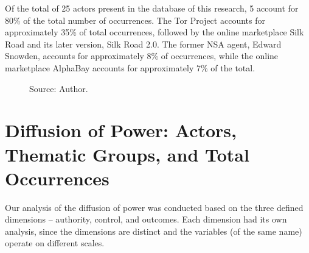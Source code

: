 Of the total of 25 actors present in the database of this research, 5 account for 80\% of the total number of occurrences. The Tor Project accounts for approximately 35\% of total occurrences, followed by the online marketplace Silk Road and its later version, Silk Road 2.0. The former NSA agent, Edward Snowden, accounts for approximately 8\% of occurrences, while the online marketplace AlphaBay accounts for approximately 7\% of the total.

\begin{figure}[H]
\centering
{}
\caption*{Source: Author.}
\end{figure}

\section{Diffusion of Power: Actors, Thematic Groups, and Total Occurrences}

Our analysis of the diffusion of power was conducted based on the three defined dimensions -- authority, control, and outcomes. Each dimension had its own analysis, since the dimensions are distinct and the variables (of the same name) operate on different scales.

